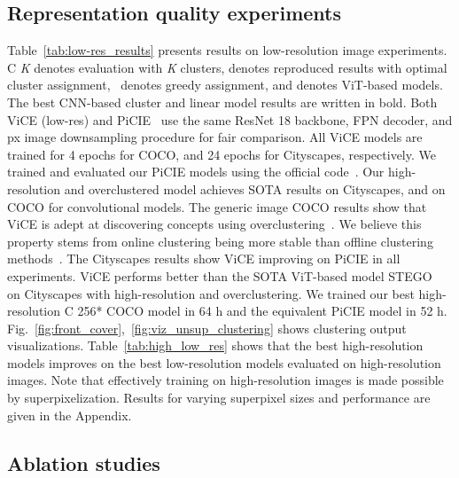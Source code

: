 \documentclass{bmvc2k}
\begin{document}
\subsection{Representation quality experiments}

Table~\ref{tab:low-res_results} presents results on low-resolution image experiments.  C \textit{K} denotes evaluation with \textit{K} clusters,  denotes reproduced results with optimal cluster assignment, ~denotes greedy assignment, and  denotes ViT-based models. The best CNN-based cluster and linear model results are written in bold. Both ViCE (low-res) and PiCIE~\cite{Cho2021PiCIE} use the same ResNet 18 backbone, FPN decoder, and  px image downsampling procedure for fair comparison. All ViCE models are trained for 4 epochs for COCO, and 24 epochs for Cityscapes, respectively. We trained and evaluated our PiCIE models using the official code~\cite{Cho2021PiCIE}.
Our high-resolution and overclustered model achieves SOTA results on Cityscapes, and on COCO for convolutional models. 
The generic image COCO results show that ViCE is adept at discovering concepts using overclustering~\cite{VanGansbeke2020LearningTC}. We believe this property stems from online clustering being more stable than offline clustering methods~\cite{Caron2020SwAV, Zhan2020OnlineDC}. The Cityscapes results show ViCE improving on PiCIE in all experiments. ViCE performs better than the SOTA ViT-based model STEGO~\cite{Hamilton2022STEGO} on Cityscapes with high-resolution and overclustering.
We trained our best high-resolution C 256* COCO model in 64 h and the equivalent PiCIE model in 52 h.
Fig.~\ref{fig:front_cover},~\ref{fig:viz_unsup_clustering} shows clustering output visualizations.
Table~\ref{tab:high_low_res} shows that the best high-resolution models improves on the best low-resolution models evaluated on high-resolution images. Note that effectively training on high-resolution images is made possible by superpixelization. Results for varying superpixel sizes and performance are given in the Appendix.

\subsection{Ablation studies}
\end{document}
